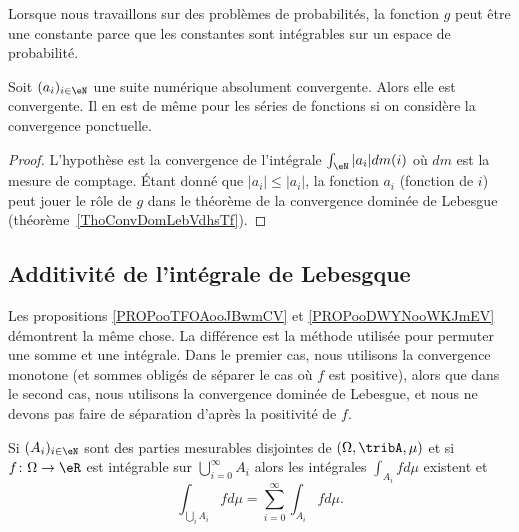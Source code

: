 \begin{remark}
	Lorsque nous travaillons sur des problèmes de probabilités, la fonction \( g\) peut être une constante parce que les constantes sont intégrables sur un espace de probabilité.
\end{remark}

\begin{corollary}       \label{CorCvAbsNormwEZdRc}
	Soit \( (a_i)_{i\in \eN}\) une suite numérique absolument convergente. Alors elle est convergente. Il en est de même pour les séries de fonctions si on considère la convergence ponctuelle.
\end{corollary}

\begin{proof}
	L'hypothèse est la convergence de l'intégrale \( \int_{\eN}| a_i |dm(i)\) où \( dm\) est la mesure de comptage. Étant donné que \( | a_i |\leq | a_i |\), la fonction \( a_i\) (fonction de \( i\)) peut jouer le rôle de \( g\) dans le théorème de la convergence dominée de Lebesgue (théorème~\ref{ThoConvDomLebVdhsTf}).
\end{proof}

\subsection{Additivité de l'intégrale de Lebesgque}

Les propositions \ref{PROPooTFOAooJBwmCV} et \ref{PROPooDWYNooWKJmEV} démontrent la même chose. La différence est la méthode utilisée pour permuter une somme et une intégrale. Dans le premier cas, nous utilisons la convergence monotone (et sommes obligés de séparer le cas où \( f\) est positive), alors que dans le second cas, nous utilisons la convergence dominée de Lebesgue, et nous ne devons pas faire de séparation d'après la positivité de \( f\).

\begin{proposition}      \label{PROPooTFOAooJBwmCV}
	Si \( (A_i)_{i\in \eN} \) sont des parties mesurables disjointes de \( (\Omega,\tribA,\mu)\) et si \( f\colon \Omega\to \eR\) est intégrable sur \( \bigcup_{i=0}^{\infty}A_i\)  alors les intégrales \( \int_{A_i}fd\mu\) existent et
	\begin{equation}
		\int_{\bigcup_iA_i}fd\mu=\sum_{i=0}^{\infty}\int_{A_i}fd\mu.
	\end{equation}
\end{proposition}

